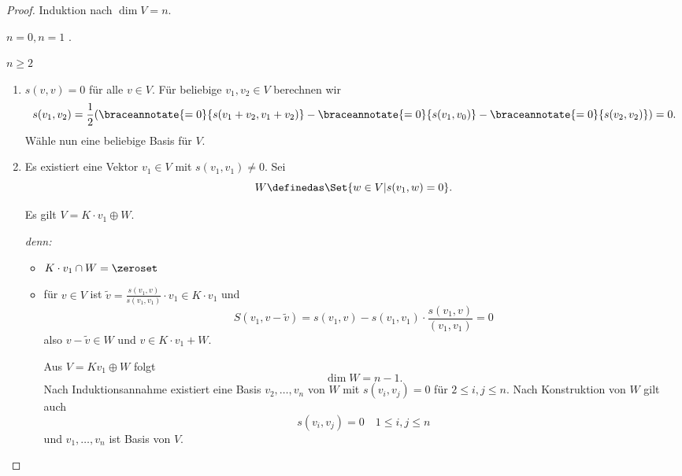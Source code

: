 \begin{proof}
  Induktion nach \( \dim{V}=n \).
  \begin{proofdescription}
    \item[\( n=0, n=1 \)] \checkmark.
    \item[\( n\geq 2 \)] \begin{enumerate}[label=Fall \rechtsklammer{\alph*}]
      \item \( s(v,v)=0 \) für alle \( v\in V \). Für beliebige \( v_1,v_2\in V \) berechnen wir
      \begin{equation*}
        s(v_1,v_2)=\frac{1}{2}(\braceannotate{=0}{s(v_1+v_2,v_1+v_2)}-\braceannotate{=0}{s(v_1,v_0)}-\braceannotate{=0}{s(v_2,v_2)})=0.
      \end{equation*}
      Wähle nun eine beliebige Basis für \( V \).
      \item Es existiert eine Vektor \( v_1\in V \) mit \( s(v_1,v_1)\neq 0 \). Sei 
      \begin{equation*}
        W\definedas \Set{w\in V|s(v_1,w)=0}.
      \end{equation*}
      \begin{behauptung}
        Es gilt \( V=K\cdot v_1\oplus W \).
      \end{behauptung}
      \emph{denn:} \begin{itemize}
        \item \( K\cdot v_1\cap W=\zeroset \)
        \item für \( v\in V \) ist \( \tilde{v}=\frac{s(v_1,v)}{s(v_1,v_1)}\cdot v_1\in K\cdot v_1 \) und
        \begin{equation*}
          S(v_1,v-\tilde{v})=s(v_1,v)-s(v_1,v_1)\cdot\frac{s(v_1,v)}{(v_1,v_1)}=0
        \end{equation*}
        also \( v-\tilde{v}\in W \) und \( v\in K\cdot v_1+W \).

        Aus \( V=K v_1\oplus W \) folgt
        \begin{equation*}
          \dim{W}=n-1.
        \end{equation*}
        Nach Induktionsannahme existiert eine Basis \( v_2,\dotsc,v_n \) von \( W \) mit \( s(v_i,v_j)=0 \) für \( 2\leq i,j\leq n \). Nach Konstruktion von \( W \) gilt auch
        \begin{equation*}
          s(v_i,v_j)=0\quad 1\leq i,j\leq n
        \end{equation*}
        und \( v_1,\dotsc,v_n \) ist Basis von \( V \).
      \end{itemize}
    \end{enumerate} 
  \end{proofdescription}
  
\end{proof}